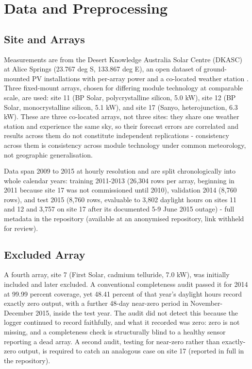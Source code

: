 \section{Data and Preprocessing}
\label{sec:data}

\subsection{Site and Arrays}
\label{sec:data-site-arrays}

Measurements are from the Desert Knowledge Australia Solar Centre
(DKASC) at Alice Springs (23.767 deg S, 133.867 deg E), an open
dataset of ground-mounted PV installations with per-array power and a
co-located weather station \cite{dkasolarcentre}. Three fixed-mount
arrays, chosen for differing module technology at comparable scale,
are used: site 11 (BP Solar, polycrystalline silicon, 5.0 kW), site 12
(BP Solar, monocrystalline silicon, 5.1 kW), and site 17 (Sanyo,
heterojunction, 6.3 kW). These are three co-located arrays, not three
sites: they share one weather station and experience the same sky, so
their forecast errors are correlated and results across them do not
constitute independent replications - consistency across them is
consistency across module technology under common meteorology, not
geographic generalisation.

Data span 2009 to 2015 at hourly resolution and are split
chronologically into whole calendar years: training 2011-2013 (26,304
rows per array, beginning in 2011 because site 17 was not commissioned
until 2010), validation 2014 (8,760 rows), and test 2015 (8,760 rows,
evaluable to 3,802 daylight hours on sites 11 and 12 and 3,757 on site
17 after its documented 5-9 June 2015 outage) - full metadata in the
repository (available at an anonymised repository, link withheld for
review).

\subsection{Excluded Array}
\label{sec:data-excluded-array}

A fourth array, site 7 (First Solar, cadmium telluride, 7.0 kW), was
initially included and later excluded. A conventional completeness
audit passed it for 2014 at 99.99 percent coverage, yet 48.41 percent
of that year's daylight hours record exactly zero output, with a
further 48-day near-zero period in November-December 2015, inside the
test year. The audit did not detect this because the logger continued
to record faithfully, and what it recorded was zero: zero is not
missing, and a completeness check is structurally blind to a healthy
sensor reporting a dead array. A second audit, testing for near-zero
rather than exactly-zero output, is required to catch an analogous
case on site 17 (reported in full in the repository).

